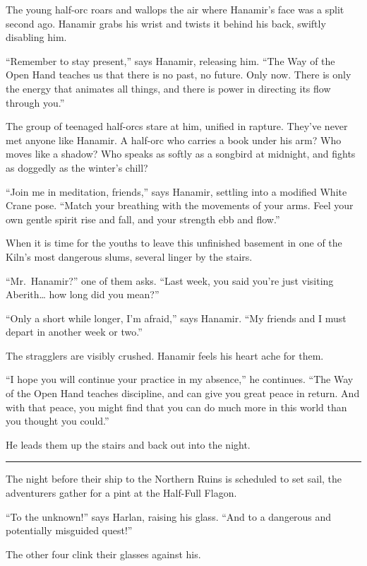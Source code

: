 \documentclass[smalldemyvopaper,11pt,twoside,onecolumn,openright,extrafontsizes]{memoir}
\begin{document}
The young half-orc roars and wallops the air where Hanamir's face was a
split second ago. Hanamir grabs his wrist and twists it behind his back,
swiftly disabling him.

``Remember to stay present,'' says Hanamir, releasing him. ``The Way of
the Open Hand teaches us that there is no past, no future. Only now.
There is only the energy that animates all things, and there is power in
directing its flow through you.''

The group of teenaged half-orcs stare at him, unified in rapture.
They've never met anyone like Hanamir. A half-orc who carries a book
under his arm? Who moves like a shadow? Who speaks as softly as a
songbird at midnight, and fights as doggedly as the winter's chill?

``Join me in meditation, friends,'' says Hanamir, settling into a
modified White Crane pose. ``Match your breathing with the movements of
your arms. Feel your own gentle spirit rise and fall, and your strength
ebb and flow.''

When it is time for the youths to leave this unfinished basement in one
of the Kiln's most dangerous slums, several linger by the stairs.

``Mr.~Hanamir?'' one of them asks. ``Last week, you said you're just
visiting Aberith\ldots{} how long did you mean?''

``Only a short while longer, I'm afraid,'' says Hanamir. ``My friends
and I must depart in another week or two.''

The stragglers are visibly crushed. Hanamir feels his heart ache for
them.

``I hope you will continue your practice in my absence,'' he continues.
``The Way of the Open Hand teaches discipline, and can give you great
peace in return. And with that peace, you might find that you can do
much more in this world than you thought you could.''

He leads them up the stairs and back out into the night.

\begin{center}\rule{0.5\linewidth}{\linethickness}\end{center}

The night before their ship to the Northern Ruins is scheduled to set
sail, the adventurers gather for a pint at the Half-Full Flagon.

``To the unknown!'' says Harlan, raising his glass. ``And to a dangerous
and potentially misguided quest!''

The other four clink their glasses against his.
\end{document}
